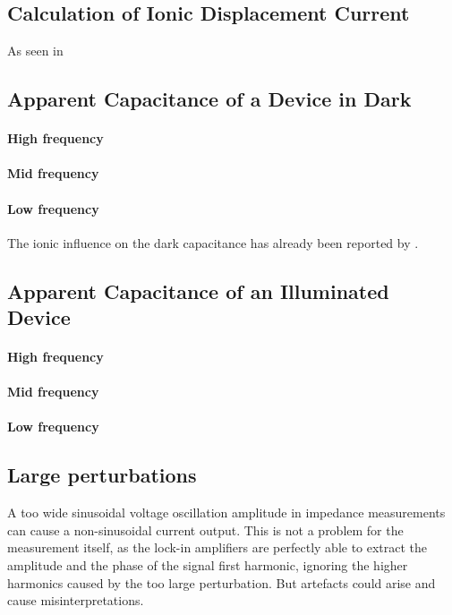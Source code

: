 	\subsection{Calculation of Ionic Displacement Current}\label{displacement_current_ionic}
		As seen in 

\subsection{Apparent Capacitance of a Device in Dark}
\paragraph{High frequency}
\paragraph{Mid frequency}
\paragraph{Low frequency}
The ionic influence on the dark capacitance has already been reported by .

\subsection{Apparent Capacitance of an Illuminated Device}
\paragraph{High frequency}
\paragraph{Mid frequency}
\paragraph{Low frequency}



\subsection{Large perturbations}\label{impedance-large_perturbations}
A too wide sinusoidal voltage oscillation amplitude in impedance measurements can cause a non-sinusoidal current output.
This is not a problem for the measurement itself, as the lock-in amplifiers are perfectly able to extract the amplitude and the phase of the signal first harmonic, ignoring the higher harmonics caused by the too large perturbation.
But artefacts could arise and cause misinterpretations.



